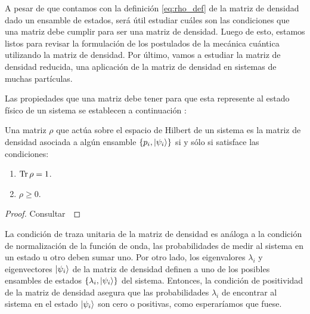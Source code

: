 A pesar de que contamos con la definición \eqref{eq:rho_def} de 
la matriz de densidad dado un ensamble de estados, será útil 
estudiar cuáles son las condiciones que una matriz debe cumplir 
para ser una matriz de densidad. Luego de esto, estamos listos 
para revisar la formulación de los postulados de la mecánica cuántica
utilizando la matriz de densidad. Por último, vamos a estudiar la
matriz de densidad reducida, una aplicación de la matriz de densidad 
en sistemas de muchas partículas.

Las propiedades que una matriz debe tener para que esta represente al 
estado físico de un sistema se establecen a continuación
\cite{nielsen_chuang_2011}:
\begin{thm}\label{teo:density-operator}
Una matriz $\rho$  que actúa sobre el espacio de Hilbert de un sistema 
es la matriz de densidad asociada a algún ensamble 
$\{p_i, \ket{\psi _i} \}$ si y sólo si satisface las condiciones:
\begin{enumerate}
\item $\Tr \rho = 1$.
\item $\rho \geq 0$.
\end{enumerate}	
\end{thm} 
\begin{proof} Consultar~\cite[p.~101]{nielsen_chuang_2011} \end{proof}

La condición de traza unitaria de la matriz de densidad es análoga
a la condición de normalización de la función de onda, las probabilidades
de medir al sistema en un estado u otro deben sumar uno. 
Por otro lado, los eigenvalores $\lambda_i$ y eigenvectores $\ket{\psi_i}$ de la 
matriz de densidad definen a uno de los posibles ensambles de estados
$\{\lambda_i, \ket{\psi_i} \}$ del sistema. Entonces,
la condición de positividad de la matriz de densidad asegura que las
probabilidades $\lambda_i$ de encontrar al sistema en el estado $\ket{\psi_i}$
son cero o positivas, como esperaríamos que fuese.

